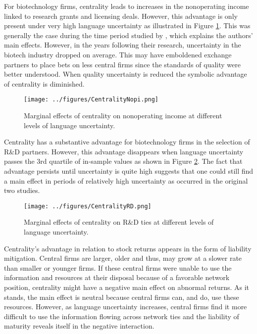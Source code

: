 For biotechnology firms, centrality leads to increases in the nonoperating income linked to research grants and licensing deals. However, this advantage is only present under very high language uncertainty as illustrated in Figure \ref{cnopi}. This was generally the case during the time period studied by \citet{powell1999}, which explains the authors' main effects. However, in the years following their research, uncertainty in the biotech industry dropped on average. This may have emboldened exchange partners to place bets on less central firms since the standards of quality were better understood. When quality uncertainty is reduced the symbolic advantage of centrality is diminished.

\begin{figure}
\begin{center}
\texttt{[image: ../figures/CentralityNopi.png]}
\caption[Marginal effects of centrality on nonop. income]{Marginal effects of centrality on nonoperating income at different levels of language uncertainty.\label{cnopi}}
\end{center}
\end{figure}

Centrality has a substantive advantage for biotechnology firms in the selection of R\&D partners. However, this advantage disappears when language uncertainty passes the 3rd quartile of in-sample values as shown in Figure \ref{crd}. The fact that advantage persists until uncertainty is quite high suggests that one could still find a main effect in periods of relatively high uncertainty as occurred in the original two studies.

\begin{figure}
\begin{center}
\texttt{[image: ../figures/CentralityRD.png]}
\caption[Marginal effects of centrality on R\&D]{Marginal effects of centrality on R\&D ties at different levels of language uncertainty.\label{crd}}
\end{center}
\end{figure}

Centrality's advantage in relation to stock returns appears in the form of liability mitigation. Central firms are larger, older and thus, may grow at a slower rate than smaller or younger firms. If these central firms were unable to use the information and resources at their disposal because of a favorable network position, centrality might have a negative main effect on abnormal returns. As it stands, the main effect is neutral because central firms can, and do, use these resources. However, as language uncertainty increases, central firms find it more difficult to use the information flowing across network ties and the liability of maturity reveals itself in the negative interaction.

